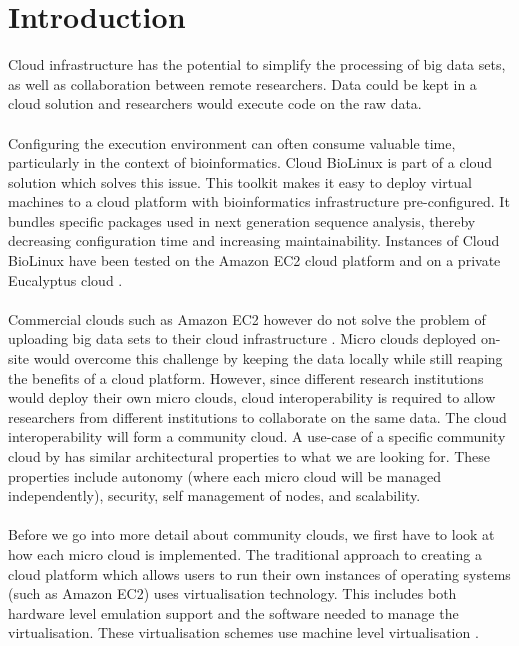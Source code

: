 \documentclass{sig-alternate-05-2015}
\begin{document}
\section{Introduction}
Cloud infrastructure has the potential to simplify the processing of big data sets, as well as collaboration between remote researchers. Data could be kept in a cloud solution and researchers would execute code on the raw data.
\\
\\
Configuring the execution environment can often consume valuable time, particularly in the context of bioinformatics. Cloud BioLinux is part of a cloud solution which solves this issue. This toolkit makes it easy to deploy virtual machines to a cloud platform with bioinformatics infrastructure pre-configured. It bundles specific packages used in next generation sequence analysis, thereby decreasing configuration time and increasing maintainability. Instances of Cloud BioLinux have been tested on the Amazon EC2 cloud platform and on a private Eucalyptus cloud \cite{krampis2012cloud}. 
\\
\\
Commercial clouds such as Amazon EC2 however do not solve the problem of uploading big data sets to their cloud infrastructure \cite{baker2010next}. Micro clouds deployed on-site would overcome this challenge by keeping the data locally while still reaping the benefits of a cloud platform. However, since different research institutions would deploy their own micro clouds, cloud interoperability is required to allow researchers from different institutions to collaborate on the same data. The cloud interoperability will form a community cloud. A use-case of a specific community cloud  by \cite{jimenez2014deploying} has similar architectural properties to what we are looking for. These properties include autonomy (where each micro cloud will be managed independently), security, self management of nodes, and scalability.
\\
\\
Before we go into more detail about community clouds, we first have to look at how each micro cloud is implemented. The traditional approach to creating a cloud platform which allows users to run their own instances of operating systems (such as Amazon EC2) uses virtualisation technology. This includes both hardware level emulation support and the software needed to manage the virtualisation. These virtualisation schemes use machine level virtualisation \cite{fink2014docker}. \\\\
\end{document}
